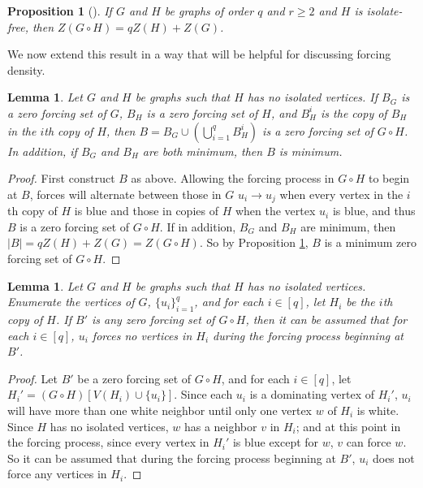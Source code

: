 \documentclass[11pt]{article}
\newtheorem{prop}[thm]{Proposition}
\newtheorem{lem}[thm]{Lemma}
\theoremstyle{definition}
\newcommand{\1}{\vspace{0.1cm}}
\newcommand{\2}{\vspace{0.2cm}}
\newcommand{\3}{\vspace{0.3cm}}
\begin{document}
\begin{prop}[\cite{cartfrac, ZGcircKs}]\label{coronaval}
If $G$ and $H$ be graphs of order $q$ and $r \geq 2$ and $H$ is isolate-free, then $Z(G \circ H)=qZ(H)+Z(G)$.
\end{prop}

We now extend this result in a way that will be helpful for discussing forcing density.

\begin{lem}\label{lem:coronasets}
Let $G$ and $H$ be graphs such that $H$ has no isolated vertices.  If $B_G$ is a zero forcing set of $G$, $B_H$ is a zero forcing set of $H$, and $B_H^i$ is the copy of $B_H$ in the $i$th copy of $H$, then $B=B_G \cup (\bigcup_{i=1}^q B_H^i)$ is a zero forcing set of $G \circ H$.  In addition, if $B_G$ and $B_H$ are both minimum, then $B$ is minimum. 
\end{lem}

\begin{proof}
First construct $B$ as above.  Allowing the forcing process in $G \circ H$ to begin at $B$, forces will alternate between those in $G$ $u_i \rightarrow u_j$ when every vertex in the $i$th copy of $H$ is blue and those in copies of $H$ when the vertex $u_i$ is blue, and thus $B$ is a zero forcing set of $G \circ H$.  If in addition, $B_G$ and $B_H$ are minimum, then $|B|=qZ(H)+Z(G)=Z(G \circ H)$.  So by Proposition \ref{coronaval}, $B$ is a minimum zero forcing set of $G \circ H$.   
\end{proof}

\begin{lem}\label{lem:coronaforce}
Let $G$ and $H$ be graphs such that $H$ has no isolated vertices.    Enumerate the vertices of $G$, $\{u_i\}_{i=1}^q$, and for each $i \in [q]$, let $H_i$ be the $i$th copy of $H$.  If $B'$ is any zero forcing set of $G \circ H$, then it can be assumed that for each $i \in [q]$, $u_i$ forces no vertices in $H_i$ during the forcing process beginning at $B'$. 
\end{lem}

\begin{proof}
Let $B'$ be a zero forcing set of $G \circ H$, and for each $i \in [q]$, let $H_i'=(G \circ H)[V(H_i) \cup \{u_i\}]$.  Since each $u_i$ is a dominating vertex of $H_i'$, $u_i$ will have more than one white neighbor until only one vertex $w$ of $H_i$ is white.  Since $H$ has no isolated vertices, $w$ has a neighbor $v$ in $H_i$; and at this point in the forcing process, since every vertex in $H_i'$ is blue except for $w$, $v$ can force $w$.  So it can be assumed that during the forcing process beginning at $B'$, $u_i$ does not force any vertices in $H_i$.  
\end{proof}
\end{document}
